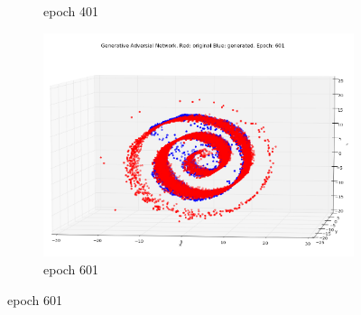 \begin{figure}
\begin{subfigure}[t]{.4\textwidth}
\caption{epoch 401}
\end{subfigure}%
\begin{subfigure}[t]{.4\textwidth}
\centering
\includegraphics[width=\linewidth]{GANResults/Both601.png}
\caption{epoch 601}
\end{subfigure}

\medskip


\end{figure}
